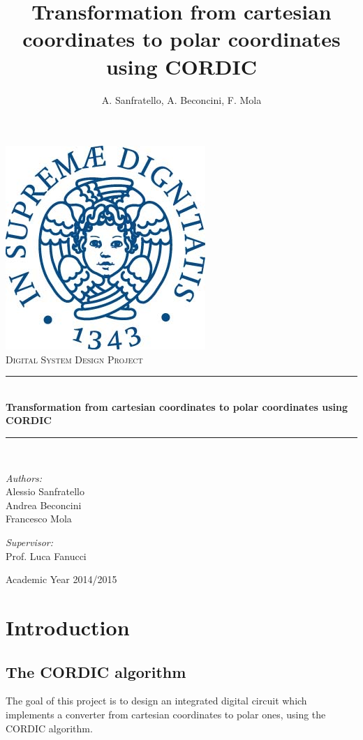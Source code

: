 \documentclass[12pt,a4paper]{report}
\author{A. Sanfratello, A. Beconcini, F. Mola}
\title{Transformation from cartesian coordinates to polar coordinates using CORDIC}
\newcommand{\HRule}{\rule{\linewidth}{0.5mm}}
\begin{document}
\begin{titlepage}
\begin{center}
	\includegraphics[scale=.60]{img/Unipi_logo.jpg}\\[3cm]
	\textsc{\Large Digital System Design Project}
	\HRule \\[0.4cm]
{ \huge \bfseries Transformation from cartesian coordinates to polar coordinates using CORDIC \\[0.4cm] }
	\HRule \\[4cm]
	\noindent
	\begin{minipage}{0.4\textwidth}
	\begin{flushleft} \large
	\emph{Authors:}\\
	Alessio Sanfratello\\
	Andrea Beconcini\\
	Francesco Mola 
	\end{flushleft}
	\end{minipage}%
	\begin{minipage}{0.4\textwidth}
	\begin{flushright} \large
	\emph{Supervisor:} \\
	Prof. Luca Fanucci
	\end{flushright}
	\end{minipage}

	\vfill
	{\large Academic Year 2014/2015}
\end{center}
\end{titlepage}

\tableofcontents

\chapter{Introduction}

\section{The CORDIC algorithm}
\label{cordic_alghorithm}
The goal of this project is to design an integrated digital circuit which implements a converter from cartesian coordinates to polar ones, using the CORDIC algorithm.
\end{document}
